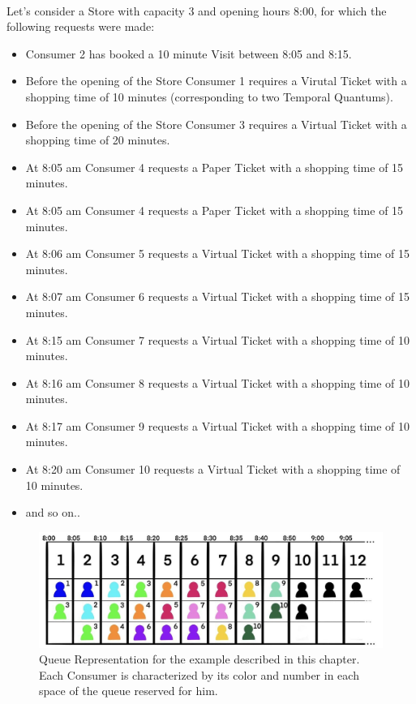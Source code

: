 \documentclass[a4paper, 12pt, oneside, table]{article}
\begin{document}
\\
Let's consider a Store with capacity 3 and opening hours 8:00, for which the following requests were made:
\begin{itemize}
    \item Consumer 2 has booked a 10 minute Visit between 8:05 and 8:15.
    \item Before the opening of the Store Consumer 1 requires a Virutal Ticket with a shopping time of 10 minutes (corresponding to two Temporal Quantums).
    \item Before the opening of the Store Consumer 3 requires a Virtual Ticket with a shopping time of 20 minutes.
    \item At 8:05 am Consumer 4 requests a Paper Ticket with a shopping time of 15 minutes.
    \item At 8:05 am Consumer 4 requests a Paper Ticket with a shopping time of 15 minutes.
    \item At 8:06 am Consumer 5 requests a Virtual Ticket with a shopping time of 15 minutes.
    \item At 8:07 am Consumer 6 requests a Virtual Ticket with a shopping time of 15 minutes.
    \item At 8:15 am Consumer 7 requests a Virtual Ticket with a shopping time of 10 minutes.
    \item At 8:16 am Consumer 8 requests a Virtual Ticket with a shopping time of 10 minutes.
    \item At 8:17 am Consumer 9 requests a Virtual Ticket with a shopping time of 10 minutes.
    \item At 8:20 am Consumer 10 requests a Virtual Ticket with a shopping time of 10 minutes.
    \item and so on..
\end{itemize}
\begin{figure}[hbt]
\centering
    \centering
    \includegraphics[height=0.15\textheight, scale=0.2, keepaspectratio]{img/queue/queue_ex1.jpg} 
    \caption{Queue Representation for the example described in this chapter. Each Consumer is characterized by its color and number in each space of the queue reserved for him.}
    \label{queueex1}
\end{figure}
\end{document}
